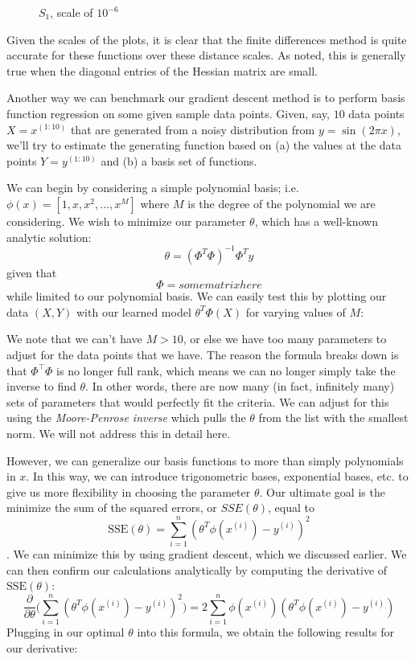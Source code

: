 \documentclass[11pt,letterpaper]{article}
\begin{document}
\begin{figure}[!htb]
  \caption{$S_1$, scale of $10^{-6}$}\label{fig:gradDifS}
\endminipage
\end{figure}

Given the scales of the plots, it is clear that the finite differences method is quite accurate for these functions over these distance scales. As noted, this is generally true when the diagonal entries of the Hessian matrix are small.

Another way we can benchmark our gradient descent method is to perform basis function regression on some given sample data points. Given, say, $10$ data points $X = x^{(1:10)}$ that are generated from a noisy distribution from $y = \sin(2\pi x)$, we'll try to estimate the generating function based on (a) the values at the data points $Y = y^{(1:10)}$ and (b) a basis set of functions.

We can begin by considering a simple polynomial basis; i.e. $\phi(x) = [1, x, x^2, \ldots , x^M]$ where $M$ is the degree of the polynomial we are considering. We wish to minimize our parameter $\theta$, which has a well-known analytic solution:
$$\theta = (\Phi^T\Phi)^{-1}\Phi^Ty$$
given that
$$\Phi = some matrix here$$
while limited to our polynomial basis. We can easily test this by plotting our data $(X, Y)$ with our learned model $\theta^T\Phi(X)$ for varying values of $M$:

We note that we can't have $M > 10$, or else we have too many parameters to adjust for the data points that we have. The reason the formula breaks down is that $\Phi^\intercal\Phi$ is no longer full rank, which means we can no longer simply take the inverse to find $\theta$. In other words, there are now many (in fact, infinitely many) sets of parameters that would perfectly fit the criteria. We can adjust for this using the \textit{Moore-Penrose inverse} which pulls the $\theta$ from the list with the smallest norm. We will not address this in detail here.

However, we can generalize our basis functions to more than simply polynomials in $x$. In this way, we can introduce trigonometric bases, exponential bases, etc. to give us more flexibility in choosing the parameter $\theta$. Our ultimate goal is the minimize the sum of the squared errors, or $SSE(\theta)$, equal to
$$\text{SSE}(\theta) = \sum_{i=1}^n (\theta^T\phi(x^{(i)}) - y^{(i)})^2$$.
We can minimize this by using gradient descent, which we discussed earlier. We can then confirm our calculations analytically by computing the derivative of $\text{SSE}(\theta)$:
$$\frac{\partial}{\partial\theta}\Big(\sum_{i=1}^n (\theta^T\phi(x^{(i)}) - y^{(i)})^2\Big) = 2\sum_{i=1}^n \phi(x^{(i)})(\theta^T\phi(x^{(i)}) - y^{(i)})$$
Plugging in our optimal $\theta$ into this formula, we obtain the following results for our derivative:
\end{document}
